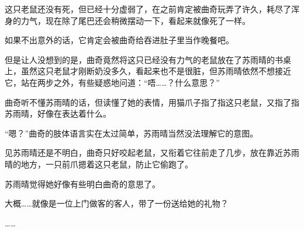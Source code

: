 这只老鼠还没有死，但已经十分虚弱了，在之前肯定被曲奇玩弄了许久，耗尽了浑身的力气，现在除了尾巴还会稍微摆动一下，看起来就像死了一样。

如果不出意外的话，它肯定会被曲奇给吞进肚子里当作晚餐吧。

但是让人没想到的是，曲奇竟然将这只已经没有力气的老鼠放在了苏雨晴的书桌上，虽然这只老鼠才刚断奶没多久，看起来也不是很脏，但苏雨晴依然不想接近它，站在两步之外，有些疑惑地问道：“唔……？什么意思？”

曲奇听不懂苏雨晴的话，但读懂了她的表情，用猫爪子指了指这只老鼠，又指了指苏雨晴，好像在表达着什么。

“嗯？”曲奇的肢体语言实在太过简单，苏雨晴当然没法理解它的意图。

见苏雨晴还是不明白，曲奇只好咬起老鼠，又衔着它往前走了几步，放在靠近苏雨晴的地方，一只前爪摁着这只老鼠，防止它偷跑了。

苏雨晴觉得她好像有些明白曲奇的意思了。

大概……就像是一位上门做客的客人，带了一份送给她的礼物？

……
